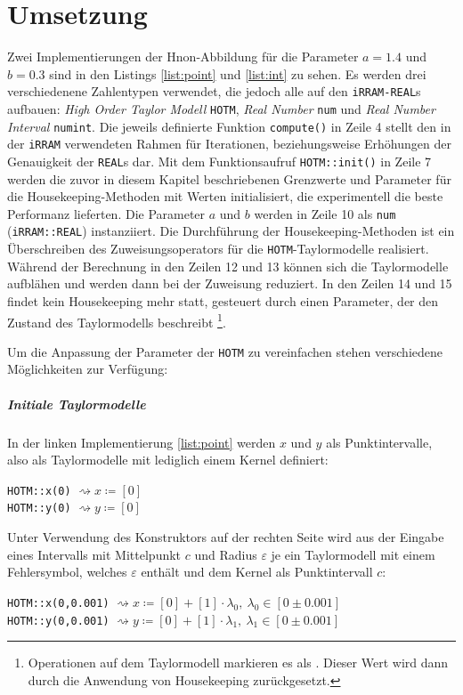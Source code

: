  \chapter{Umsetzung}  
 \label{ch:umsetung}
 Zwei Implementierungen der H\e non-Abbildung für die Parameter $a=1.4$ und $b=0.3$ sind in den Listings \ref{list:point} und \ref{list:int} zu sehen. Es werden drei verschiedenene Zahlentypen verwendet, die jedoch alle auf den \verb+iRRAM-REAL+s aufbauen: \textit{High Order Taylor Modell} \verb+HOTM+, \textit{Real Number} \verb+num+ und \textit{Real Number Interval} \verb+numint+. Die jeweils definierte Funktion \verb+compute()+ in Zeile 4 stellt den in der \verb+iRRAM+ verwendeten Rahmen für Iterationen, beziehungsweise Erhöhungen der Genauigkeit der \verb+REAL+s dar. Mit dem Funktionsaufruf \verb+HOTM::init()+ in Zeile 7 werden die zuvor in diesem Kapitel beschriebenen Grenzwerte und Parameter für die Housekeeping-Methoden mit Werten initialisiert, die experimentell die beste Performanz lieferten. Die Parameter $a$ und $b$ werden in Zeile 10 als \verb+num+ (\verb+iRRAM::REAL+) instanziiert. Die Durchführung der Housekeeping-Methoden ist ein Überschreiben des Zuweisungsoperators \anf{=} für die \verb+HOTM+-Taylormodelle realisiert. Während der Berechnung in den Zeilen 12 und 13 können sich die Taylormodelle aufblähen und werden dann bei der Zuweisung reduziert. In den Zeilen 14 und 15 findet kein Housekeeping mehr statt, gesteuert durch einen Parameter, der den Zustand des Taylormodells beschreibt \footnote{Operationen auf dem Taylormodell markieren es als . Dieser Wert wird dann durch die Anwendung von Housekeeping zurückgesetzt.}.
 
 
 Um die Anpassung der Parameter der \verb+HOTM+ zu vereinfachen stehen verschiedene Möglichkeiten zur Verfügung:
 \paragraph{Initiale Taylormodelle}
 In der linken Implementierung \ref{list:point} werden $x$ und $y$ als Punktintervalle, also als Taylormodelle mit lediglich einem Kernel definiert:
  \begin{center}
  \verb+HOTM::x(0)+ $\rightsquigarrow x\coloneqq [0]$\\
  \verb+HOTM::y(0)+ $\rightsquigarrow y\coloneqq [0]$
 \end{center}

 
 Unter Verwendung des Konstruktors auf der rechten Seite wird aus der Eingabe eines Intervalls mit Mittelpunkt $c$ und Radius $\varepsilon$ je ein Taylormodell mit einem Fehlersymbol, welches $\varepsilon$ enthält und dem Kernel als Punktintervall $c$: 
 \begin{center}
  \verb+HOTM::x(0,0.001)+ $\rightsquigarrow x\coloneqq [0] + [1] \cdot \lambda_0,\ \lambda_0 \in [0 \pm 0.001]$\\
  \verb+HOTM::y(0,0.001)+ $\rightsquigarrow y\coloneqq[0] + [1] \cdot \lambda_1,\ \lambda_1 \in [0 \pm 0.001]$
 \end{center}


